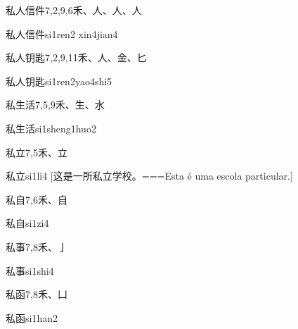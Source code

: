 \begin{Entry}{私人信件}{7,2,9,6}{⽲、⼈、⼈、⼈}
  \begin{Phonetics}{私人信件}{si1ren2 xin4jian4}
  \end{Phonetics}
\end{Entry}

\begin{Entry}{私人钥匙}{7,2,9,11}{⽲、⼈、⾦、⼔}
  \begin{Phonetics}{私人钥匙}{si1ren2yao4shi5}
  \end{Phonetics}
\end{Entry}

\begin{Entry}{私生活}{7,5,9}{⽲、⽣、⽔}
  \begin{Phonetics}{私生活}{si1sheng1huo2}
  \end{Phonetics}
\end{Entry}

\begin{Entry}{私立}{7,5}{⽲、⽴}
  \begin{Phonetics}{私立}{si1li4}
    [这是一所私立学校。===Esta é uma escola particular.]
  \end{Phonetics}
\end{Entry}

\begin{Entry}{私自}{7,6}{⽲、⾃}
  \begin{Phonetics}{私自}{si1zi4}
  \end{Phonetics}
\end{Entry}

\begin{Entry}{私事}{7,8}{⽲、⼅}
  \begin{Phonetics}{私事}{si1shi4}
  \end{Phonetics}
\end{Entry}

\begin{Entry}{私函}{7,8}{⽲、⼐}
  \begin{Phonetics}{私函}{si1han2}
  \end{Phonetics}
\end{Entry}


